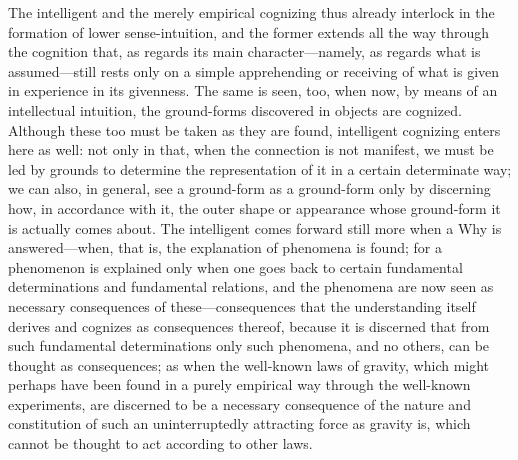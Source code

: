 \documentclass[12pt,a4paper]{book}
\begin{document}
The intelligent and the merely empirical cognizing thus already interlock in the
formation of lower sense-intuition, and the former extends all the way through
the cognition that, as regards its main character---namely, as regards what is
assumed---still rests only on a simple apprehending or receiving of what is given
in experience in its givenness. The same is seen, too, when now, by means of an
intellectual intuition, the ground-forms discovered in objects are cognized.
Although these too must be taken as they are found, intelligent cognizing enters
here as well: not only in that, when the connection is not manifest, we must be
led by grounds to determine the representation of it in a certain determinate way;
we can also, in general, see a ground-form as a ground-form only by discerning how,
in accordance with it, the outer shape or appearance whose ground-form it is
actually comes about. The intelligent comes forward still more when a Why is
answered---when, that is, the explanation of phenomena is found; for a phenomenon
is explained only when one goes back to certain fundamental determinations and
fundamental relations, and the phenomena are now seen as necessary consequences of
these---consequences that the understanding itself derives and cognizes as
consequences thereof, because it is discerned that from such fundamental
determinations only such phenomena, and no others, can be thought as consequences;
as when the well-known laws of gravity, which might perhaps have been found in a
purely empirical way through the well-known experiments, are discerned to be a
necessary consequence of the nature and constitution of such an uninterruptedly
attracting force as gravity is, which cannot be thought to act according to other
laws.
\end{document}
